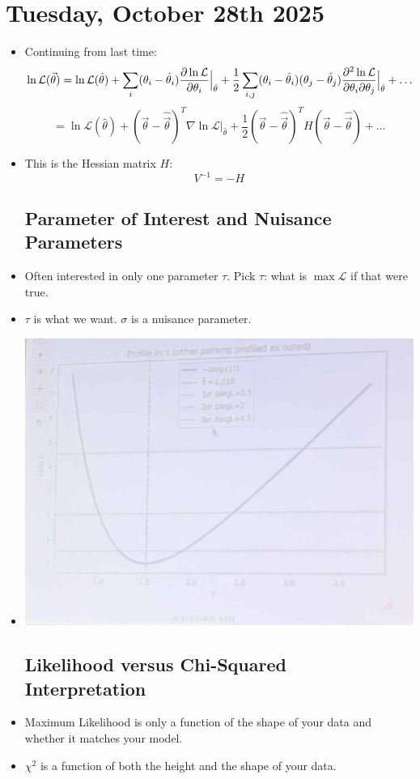\section{Tuesday, October 28th 2025}

\begin{itemize}

    \subsection{Taylor Expansion of the Log-Likelihood Around the Maximum}
    \item Continuing from last time:
          \[
              \ln \mathcal{L}(\vec{\theta}) = \ln \mathcal{L}(\hat{\theta}) +  \sum_{i} (\theta_i-\hat{\theta}_i) \pdv{\ln \mathcal{L}}{\theta_i} \Big|_{\hat{\theta}} + \frac{1}{2} \sum_{i,j} (\theta_i-\hat{\theta}_i)(\theta_j-\hat{\theta}_j) \pdv[2]{\ln \mathcal{L}}{\theta_i}{\theta_j} \Big|_{\hat{\theta}} + \ldots
          \]
          \[
              = \ln \mathcal{L}(\hat{\theta}) + (\vec{\theta} - \hat{\vec{\theta}})^T \nabla \ln \mathcal{L} \Big|_{\hat{\theta}}  + \frac{1}{2} (\vec{\theta} - \hat{\vec{\theta}})^T H (\vec{\theta} - \hat{\vec{\theta}}) + \ldots
          \]
    \item This is the Hessian matrix $H$:
          \[
              V^{-1} = - H
          \]

          \subsection{Parameter of Interest and Nuisance Parameters}
    \item Often interested in only one parameter $\tau$. Pick $\tau$: what is $\max \mathcal{L}$ if that were true.
    \item $\tau$ is what we want. $\sigma$ is a nuisance parameter.
    \item
          \includegraphics[width = 0.5\linewidth]{Images/lec14-tau-likelihood.png}

          \subsection{Likelihood versus Chi-Squared Interpretation}
    \item Maximum Likelihood is only a function of the shape of your data and whether it matches your model.
    \item $\chi^2$ is a function of both the height and the shape of your data.


\end{itemize}
